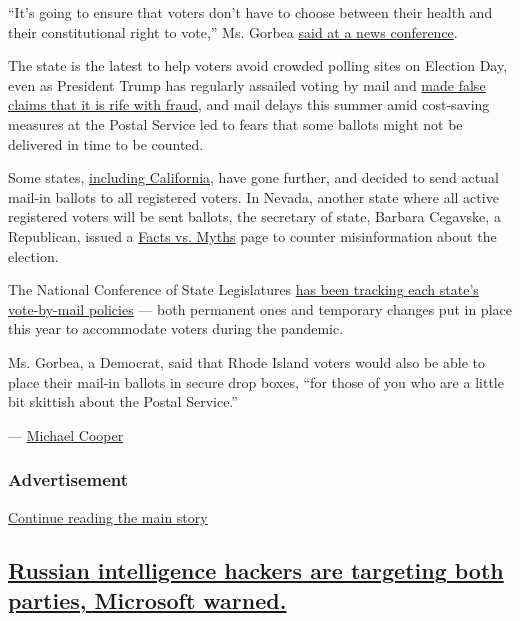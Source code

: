 ``It's going to ensure that voters don't have to choose between their
health and their constitutional right to vote,'' Ms. Gorbea
\href{https://www.facebookcorewwwi.onion/RISecState/videos/315115236424209}{said
at a news conference}.

The state is the latest to help voters avoid crowded polling sites on
Election Day, even as President Trump has regularly assailed voting by
mail and
\href{https://www.nytimes3xbfgragh.onion/article/mail-in-voting-explained.html}{made
false claims that it is rife with fraud}, and mail delays this summer
amid cost-saving measures at the Postal Service led to fears that some
ballots might not be delivered in time to be counted.

Some states,
\href{https://www.gov.ca.gov/2020/05/08/governor-newsom-issues-executive-order-to-protect-public-health-by-mailing-every-registered-voter-a-ballot-ahead-of-the-november-general-election/}{including
California}, have gone further, and decided to send actual mail-in
ballots to all registered voters. In Nevada, another state where all
active registered voters will be sent ballots, the secretary of state,
Barbara Cegavske, a Republican, issued a
\href{https://www.nvsos.gov/sos/home/showdocument?id=8842}{Facts vs.
Myths} page to counter misinformation about the election.

The National Conference of State Legislatures
\href{https://www.ncsl.org/research/elections-and-campaigns/absentee-and-mail-voting-policies-in-effect-for-the-2020-election.aspx}{has
been tracking each state's vote-by-mail policies} --- both permanent
ones and temporary changes put in place this year to accommodate voters
during the pandemic.

Ms. Gorbea, a Democrat, said that Rhode Island voters would also be able
to place their mail-in ballots in secure drop boxes, ``for those of you
who are a little bit skittish about the Postal Service.''

--- \href{https://www.nytimes3xbfgragh.onion/by/michael-cooper}{Michael
Cooper}

\hypertarget{advertisement-3}{%
\subsubsection{Advertisement}\label{advertisement-3}}

\protect\hyperlink{after-dfp-ad-mid1}{Continue reading the main story}

\hypertarget{russian-intelligence-hackers-are-targeting-both-parties-microsoft-warned}{%
\subsection{\texorpdfstring{\protect\hyperlink{russian-intelligence-hackers-are-targeting-both-parties-microsoft-warned}{Russian
intelligence hackers are targeting both parties, Microsoft
warned.}}{Russian intelligence hackers are targeting both parties, Microsoft warned.}}\label{russian-intelligence-hackers-are-targeting-both-parties-microsoft-warned}}

